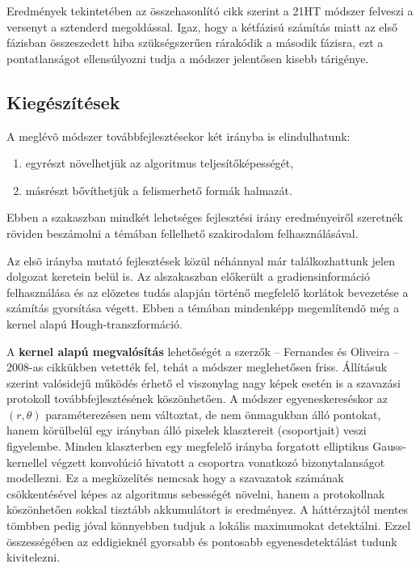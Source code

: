 Eredmények tekintetében az összehasonlító cikk szerint a 21HT módszer felveszi a versenyt a sztenderd megoldással. Igaz, hogy a kétfázisú számítás miatt az első fázisban összeszedett hiba szükségszerűen rárakódik a második fázisra, ezt a pontatlanságot ellensúlyozni tudja a módszer jelentősen kisebb tárigénye.

\subsection{Kiegészítések}\label{sect:kiegeszitesek}

A meglévõ módszer továbbfejlesztésekor két irányba is elindulhatunk:

\begin{enumerate}
 \item egyrészt növelhetjük az algoritmus teljesítőképességét,
 \item másrészt bővíthetjük a felismerhető formák halmazát.
\end{enumerate}

Ebben a szakaszban mindkét lehetséges fejlesztési irány eredményeiről szeretnék röviden beszámolni a témában fellelhető szakirodalom felhasználásával.

\bigskip

Az elsõ irányba mutató fejlesztések közül néhánnyal már találkozhattunk jelen dolgozat keretein belül is. Az  alszakaszban előkerült a gradiensinformáció felhasználása és az elõzetes tudás alapján történő megfelelő korlátok bevezetése a számítás gyorsítása végett. Ebben a témában mindenképp megemlítendõ még a kernel alapú Hough-transzformáció.

A \textbf{kernel alapú megvalósítás} lehetőségét a szerzők -- Fernandes és Oliveira -- 2008-as cikkükben \cite{hough_fernandes} vetették fel, tehát a módszer meglehetősen friss. Állításuk szerint valósidejű működés érhető el viszonylag nagy képek esetén is a szavazási protokoll továbbfejlesztésének köszönhetően. A módszer egyeneskereséskor az $ (r, \theta) $ paraméterezésen nem változtat, de nem önmagukban álló pontokat, hanem körülbelül egy irányban álló pixelek klasztereit (csoportjait) veszi figyelembe. Minden klaszterben egy megfelelő irányba forgatott elliptikus Gauss-kernellel végzett konvolúció hivatott a csoportra vonatkozó bizonytalanságot modellezni. Ez a megközelítés nemcsak hogy a szavazatok számának csökkentésével képes az algoritmus sebességét növelni, hanem a protokollnak köszönhetően sokkal tisztább akkumulátort is eredményez. A háttérzajtól mentes tömbben pedig jóval könnyebben tudjuk a lokális maximumokat detektálni. Ezzel összességében az eddigieknél gyorsabb és pontosabb egyenesdetektálást tudunk kivitelezni.

